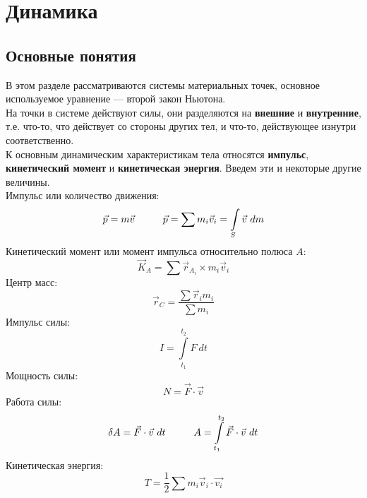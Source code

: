 \section{Динамика}
\subsection{Основные понятия}
В этом разделе рассматриваются системы материальных точек, основное используемое уравнение --- второй закон Ньютона.\\

На точки в системе действуют силы, они разделяются на \textbf{внешние} и \textbf{внутренние}, т.е. что-то, что действует со стороны других тел, и что-то, действующее изнутри соответственно.\\

К основным динамическим характеристикам тела относятся \textbf{импульс}, \textbf{кинетический момент} и \textbf{кинетическая энергия}. Введем эти и некоторые другие величины.\\

Импульс или количество движения:
\[
\vec{p} = m\vec{v} \hspace*{1cm} \vec{p} = \sum m_i\vec{v}_i = \int\limits_S\vec{v}~dm
\]
Кинетический момент или момент импульса относительно полюса $A$:
\[
\vec{K}_A = \sum \vec{r}_{A_i} \times m_i\vec{v}_i
\]
Центр масс:
\[
\vec{r}_C = \dfrac{\sum \vec{r}_im_i}{\sum m_i}
\]
Импульс силы:
\[
I = \int\limits_{t_1}^{t_2} F~d t
\]
Мощность силы:
\[
N = \vec{F} \cdot \vec{v}
\]
Работа силы:
\[
\delta A = \vec{F} \cdot \vec{v}~ dt \hspace*{1cm} A = \int\limits_{t_1}^{t_2} \vec{F} \cdot \vec{v}~d t
\]
Кинетическая энергия:
\[
T = \dfrac{1}{2}\sum m_i\vec{v}_i \cdot \vec{v_i}
\]